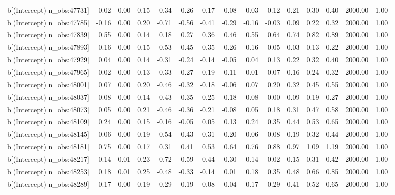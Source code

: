 \begin{table}[ht]
\begin{tabular}{rrrrrrrrrrrrrrr}
  b[(Intercept) n\_obs:47731] & 0.02 & 0.00 & 0.15 & -0.34 & -0.26 & -0.17 & -0.08 & 0.03 & 0.12 & 0.21 & 0.30 & 0.40 & 2000.00 & 1.00 \\ 
  b[(Intercept) n\_obs:47785] & -0.16 & 0.00 & 0.20 & -0.71 & -0.56 & -0.41 & -0.29 & -0.16 & -0.03 & 0.09 & 0.22 & 0.32 & 2000.00 & 1.00 \\ 
  b[(Intercept) n\_obs:47839] & 0.55 & 0.00 & 0.14 & 0.18 & 0.27 & 0.36 & 0.46 & 0.55 & 0.64 & 0.74 & 0.82 & 0.89 & 2000.00 & 1.00 \\ 
  b[(Intercept) n\_obs:47893] & -0.16 & 0.00 & 0.15 & -0.53 & -0.45 & -0.35 & -0.26 & -0.16 & -0.05 & 0.03 & 0.13 & 0.22 & 2000.00 & 1.00 \\ 
  b[(Intercept) n\_obs:47929] & 0.04 & 0.00 & 0.14 & -0.31 & -0.24 & -0.14 & -0.05 & 0.04 & 0.13 & 0.22 & 0.32 & 0.40 & 2000.00 & 1.00 \\ 
  b[(Intercept) n\_obs:47965] & -0.02 & 0.00 & 0.13 & -0.33 & -0.27 & -0.19 & -0.11 & -0.01 & 0.07 & 0.16 & 0.24 & 0.32 & 2000.00 & 1.00 \\ 
  b[(Intercept) n\_obs:48001] & 0.07 & 0.00 & 0.20 & -0.46 & -0.32 & -0.18 & -0.06 & 0.07 & 0.20 & 0.32 & 0.45 & 0.55 & 2000.00 & 1.00 \\ 
  b[(Intercept) n\_obs:48037] & -0.08 & 0.00 & 0.14 & -0.43 & -0.35 & -0.25 & -0.18 & -0.08 & 0.00 & 0.09 & 0.19 & 0.27 & 2000.00 & 1.00 \\ 
  b[(Intercept) n\_obs:48073] & 0.05 & 0.00 & 0.21 & -0.46 & -0.36 & -0.21 & -0.08 & 0.05 & 0.18 & 0.31 & 0.47 & 0.58 & 2000.00 & 1.00 \\ 
  b[(Intercept) n\_obs:48109] & 0.24 & 0.00 & 0.15 & -0.16 & -0.05 & 0.05 & 0.13 & 0.24 & 0.35 & 0.44 & 0.53 & 0.65 & 2000.00 & 1.00 \\ 
  b[(Intercept) n\_obs:48145] & -0.06 & 0.00 & 0.19 & -0.54 & -0.43 & -0.31 & -0.20 & -0.06 & 0.08 & 0.19 & 0.32 & 0.44 & 2000.00 & 1.00 \\ 
  b[(Intercept) n\_obs:48181] & 0.75 & 0.00 & 0.17 & 0.31 & 0.41 & 0.53 & 0.64 & 0.76 & 0.88 & 0.97 & 1.09 & 1.19 & 2000.00 & 1.00 \\ 
  b[(Intercept) n\_obs:48217] & -0.14 & 0.01 & 0.23 & -0.72 & -0.59 & -0.44 & -0.30 & -0.14 & 0.02 & 0.15 & 0.31 & 0.42 & 2000.00 & 1.00 \\ 
  b[(Intercept) n\_obs:48253] & 0.18 & 0.01 & 0.25 & -0.48 & -0.33 & -0.14 & 0.01 & 0.18 & 0.35 & 0.48 & 0.66 & 0.85 & 2000.00 & 1.00 \\ 
  b[(Intercept) n\_obs:48289] & 0.17 & 0.00 & 0.19 & -0.29 & -0.19 & -0.08 & 0.04 & 0.17 & 0.29 & 0.41 & 0.52 & 0.65 & 2000.00 & 1.00 \\ 

\end{tabular}
\end{table}
